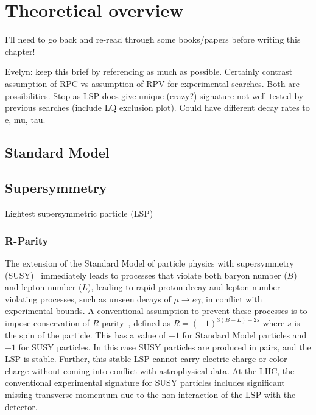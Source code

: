 \chapter[Theoretical overview][Theory]{Theoretical overview}
\label{ch:theory}

{\color{red} I'll need to go back and re-read through some books/papers before
  writing this chapter!}

{\color{red} Evelyn: 
keep this brief by referencing as much as possible.
Certainly contrast assumption of RPC vs assumption of RPV for experimental
searches.
Both are possibilities.
Stop as LSP does give unique (crazy?) signature not well
tested by previous searches (include LQ exclusion plot).
Could have different
decay rates to e, mu, tau.
}

\section{Standard Model}

\section{Supersymmetry}

Lightest supersymmetric particle (LSP) 

\subsection{R-Parity}

The extension of the Standard Model of particle physics with
supersymmetry (SUSY)~\cite{Miyazawa:1966,Ramond:1971gb,Golfand:1971iw,
Neveu:1971rx,Neveu:1971iv,Gervais:1971ji,Volkov:1973ix,Wess:1973kz,Wess:1974tw}
immediately leads to processes that violate both baryon number ($B$) and
lepton number ($L$), leading to rapid proton decay and
lepton-number-violating processes, such as unseen decays of
$\mu \to e\gamma$, in conflict with experimental bounds.
A conventional assumption to prevent these processes is to impose
conservation of $R$-parity~\cite{Fayet:1976et,Fayet:1977yc,Farrar:1978xj,
Fayet:1979sa,Dimopoulos:1981zb},
defined as $R=(-1)^{3(B-L)+2s}$ where $s$ is the spin of the particle.
This has a value of $+1$ for Standard Model particles and $-1$ for
SUSY particles.
In this case SUSY particles are produced in pairs, and the LSP is stable.
Further, this stable LSP cannot carry electric charge or color charge without
coming into conflict with astrophysical data.
At the LHC, the conventional experimental signature for SUSY particles
includes significant missing transverse momentum due to the non-interaction of
the LSP with the detector.

